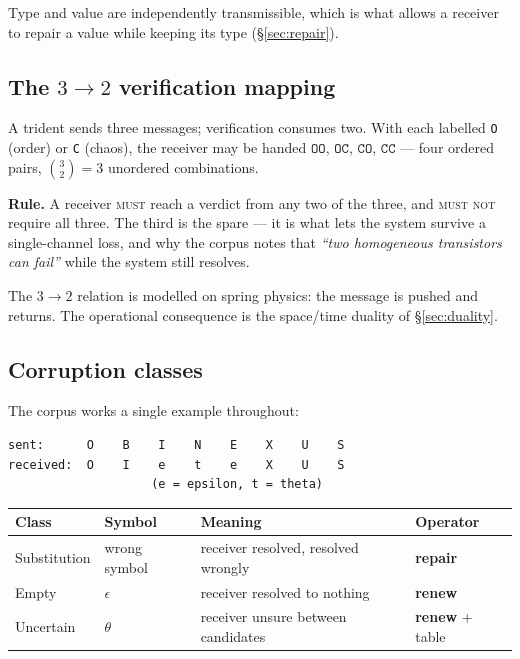 \documentclass[11pt,a4paper]{article}
\newcommand{\MUST}{\textsc{must}}
\newcommand{\MUSTNOT}{\textsc{must not}}
\begin{document}
Type and value are independently transmissible, which is what allows a receiver
to repair a value while keeping its type (\S\ref{sec:repair}).

\subsection{The $3 \rightarrow 2$ verification mapping}
\label{sec:threetwo}

A trident sends three messages; verification consumes two. With each labelled
\texttt{O} (order) or \texttt{C} (chaos), the receiver may be handed
$\texttt{OO}$, $\texttt{OC}$, $\texttt{CO}$, $\texttt{CC}$ --- four ordered
pairs, $\binom{3}{2} = 3$ unordered combinations.

\begin{ruleblock}
\textbf{Rule.} A receiver \MUST{} reach a verdict from any two of the three, and
\MUSTNOT{} require all three. The third is the spare --- it is what lets the
system survive a single-channel loss, and why the corpus notes that \emph{``two
homogeneous transistors can fail''} while the system still resolves.
\end{ruleblock}

The $3 \rightarrow 2$ relation is modelled on spring physics: the message is
pushed and returns. The operational consequence is the space/time duality of
\S\ref{sec:duality}.

\subsection{Corruption classes}
\label{sec:corrupt}

The corpus works a single example throughout:

\begin{Verbatim}[fontsize=\small,frame=single]
sent:      O    B    I    N    E    X    U    S
received:  O    I    e    t    e    X    U    S
                    (e = epsilon, t = theta)
\end{Verbatim}

\begin{center}
\begin{tabular}{@{}llp{6.0cm}l@{}}
\toprule
\textbf{Class} & \textbf{Symbol} & \textbf{Meaning} & \textbf{Operator} \\
\midrule
Substitution & wrong symbol & receiver resolved, resolved wrongly & \textbf{repair} \\
Empty & $\epsilon$ & receiver resolved to nothing & \textbf{renew} \\
Uncertain & $\theta$ & receiver unsure between candidates & \textbf{renew} + table \\
\bottomrule
\end{tabular}
\end{center}
\end{document}

